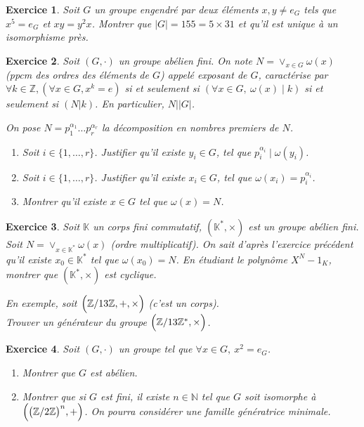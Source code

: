 \documentclass[12pt]{article}
\newtheorem{exercise}{Exercice}[section]
\theoremstyle{remark}
\theoremstyle{remark}
\newcommand{\K}{\mathbb{K}} \newcommand{\R}{\mathbb{R}}
\newcommand{\N}{\mathbb{N}} \newcommand{\Z}{\mathbb{Z}}
\begin{document}
\begin{exercise}
	Soit $G$ un groupe engendré par deux éléments $x,y\neq e_{G}$ tels que
	$x^5=e_{G}$ et $xy=y^2x$. Montrer que $\vert G\vert=155=5\times31$ et qu'il
	est unique à un isomorphisme près.
\end{exercise}

\begin{exercise}
	Soit $(G,\cdot)$ un groupe abélien fini. On note $N=\vee_{x\in G}\omega(x)$
	(ppcm des ordres des éléments de $G$) appelé exposant de $G$, caractérise par
	$\forall k\in\Z, (\forall x\in G,x^{k}=e)$ si et seulement si $(\forall x\in
	G,~\omega(x)\mid k)$ si et seulement si $(N\vert k)$. En particulier,
	$N\mid\vert G\vert$.

	On pose $N=p_{1}^{\alpha_{1}}\dots p_{r}^{\alpha_{r}}$ la décomposition en
	nombres premiers de $N$.
	\begin{enumerate}
		\item
		Soit $i\in\{1,\dots,r\}$. Justifier qu'il existe $y_{i}\in G$, tel que
		$p_{i}^{\alpha_{i}}\mid \omega(y_{i})$.
		\item
		Soit $i\in\{1,\dots,r\}$. Justifier qu'il existe $x_{i}\in G$, tel que
		$\omega(x_{i})=p_{i}^{\alpha_{i}}$.
		\item
		Montrer qu'il existe $x\in G$ tel que $\omega(x)=N$.
	\end{enumerate}
\end{exercise}

\begin{exercise}
	Soit $\K$ un corps fini commutatif, $(\K^*,\times)$ est un groupe abélien
	fini. Soit $N=\vee_{x\in \K^*}\omega(x)$ (ordre multiplicatif). On sait
	d'après l'exercice précédent qu'il existe $x_{0}\in\K^*$ tel que
	$\omega(x_{0})=N$. En étudiant le polynôme $X^{N}-1_{K}$, montrer que
	$(\K^*,\times)$ est cyclique.
	
	En exemple, soit $\Bigl(\Z/13\Z,+,\times\Bigr)$ (c'est un corps).\\
	Trouver un générateur du groupe $\Bigl(\Z/13\Z^*,\times\Bigr)$.
\end{exercise}

\begin{exercise}
	Soit $(G,\cdot)$ un groupe tel que $\forall x\in G,~x^2=e_{G}$.
	\begin{enumerate}
		\item
		Montrer que $G$ est abélien.
		\item
		Montrer que si $G$ est fini, il existe $n\in\N$ tel que $G$ soit isomorphe
		à $\Bigl(\bigl(\Z/2\Z\bigr)^n,+\Bigr)$. On pourra considérer une famille
		génératrice minimale.
	\end{enumerate}
\end{exercise}
\end{document}
